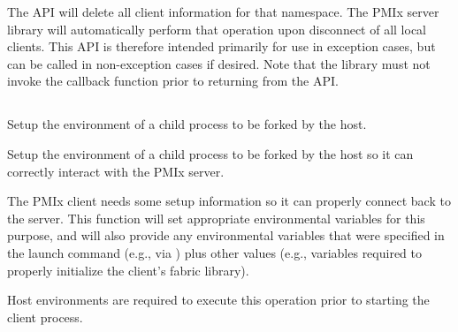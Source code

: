 \descr

The  \ac{API} will delete all client information for that namespace. The \ac{PMIx} server library will automatically perform that operation upon disconnect of all local clients.
This \ac{API} is therefore intended primarily for use in exception cases, but can be called in non-exception cases if desired. Note that the library must not invoke the callback function prior to returning from the \ac{API}.


\subsection{}

\summary

Setup the environment of a child process to be forked by the host.

\format


\begin{arglist}
\end{arglist}

\returnsimple

\descr

Setup the environment of a child process to be forked by the host so it can correctly interact with the PMIx server.

The \ac{PMIx} client needs some setup information so it can properly connect back to the server.
This function will set appropriate environmental variables for this purpose, and will also provide any environmental variables that were specified in the launch command (e.g., via ) plus other values (e.g., variables required to properly initialize the client's fabric library).

\advicermstart
Host environments are required to execute this operation prior to starting the client process.
\advicermend


\subsection{}

